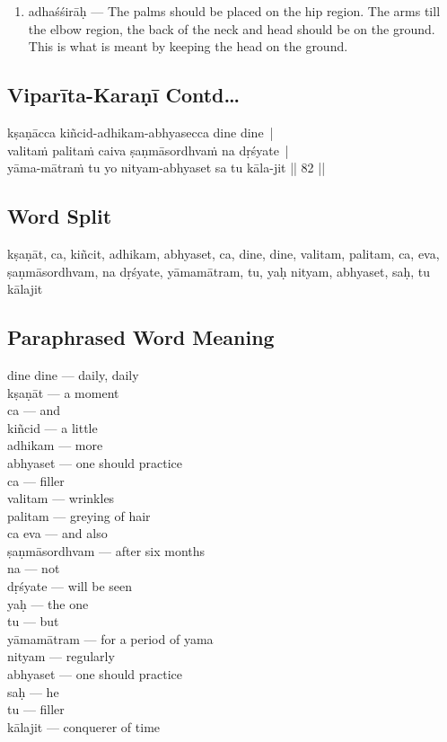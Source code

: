 \begin{enumerate}
\item adhaśśirāḥ --- The palms should be placed on the hip region. The arms till the elbow region, the back of the neck and head should be on the ground.  This is what is meant by keeping the head on the ground.  	
\end{enumerate}

\subsection*{Viparīta-Karaṇī Contd…}

\begin{shloka}
kṣaṇācca kiñcid-adhikam-abhyasecca dine dine |\\
valitaṁ palitaṁ caiva ṣaṇmāsordhvaṁ na dṛśyate |\\
yāma-mātraṁ tu yo nityam-abhyaset sa tu kāla-jit || 82 ||
\end{shloka}

\subsection*{Word Split}

kṣaṇāt, ca, kiñcit, adhikam, abhyaset, ca, dine, dine, valitam, palitam, ca, eva, ṣaṇmāsordhvam, na dṛśyate, yāmamātram, tu, yaḥ nityam, abhyaset, saḥ, tu kālajit

\subsection*{Paraphrased Word Meaning}

\begin{multicols}{2}
dine dine --- daily, daily\\
kṣaṇāt --- a moment \\
ca ---  and \\
kiñcid ---  a little\\
adhikam --- more \\
abhyaset --- one should practice \\
ca  ---  filler \\
valitam --- wrinkles \\
palitam --- greying of hair\\
ca eva --- and also\\
ṣaṇmāsordhvam --- after six months \\
na --- not \\
dṛśyate --- will be seen \\
yaḥ ---  the one \\
tu --- but \\
yāmamātram --- for a period of yama \\
nityam --- regularly\\
abhyaset --- one should practice\\ 
saḥ --- he \\
tu --- filler  \\
kālajit --- conquerer of time
\end{multicols}

